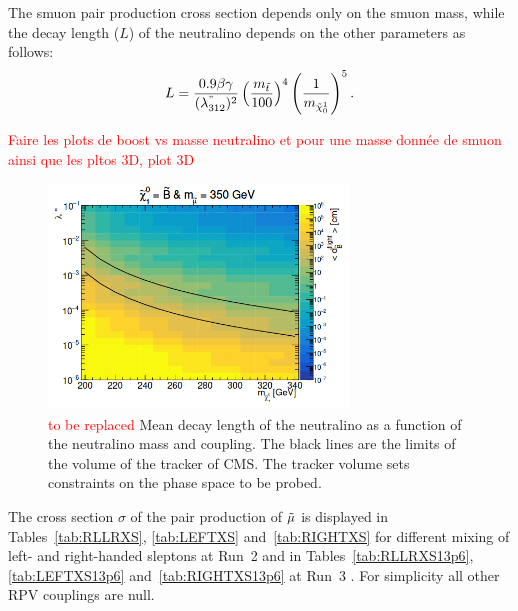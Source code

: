 \documentclass{cernatlasnote}
\begin{document}
\begin{appendices}
The smuon pair production cross section depends only on the smuon mass, while the decay length ($L$) of the neutralino depends on the other parameters as follows:
$$ L = \frac{0.9 \beta\gamma}{(\lambda^{"}_{312})^2} \left(\frac{m_{\Tilde{t}}}{100}\right)^{4} \left(\frac{1}{m_{\Tilde{\chi}_{0}^{1}}}\right)^5. $$

\textcolor{red}{Faire les plots de boost vs masse neutralino et pour une masse donnée de smuon ainsi que les pltos 3D, plot 3D}

\begin{figure}[ht]
\centering
\includegraphics[height=6cm, width=8cm, trim= 0cm 0cm 0cm 0.cm,clip]{images/PhaseSPace/Meandecaylength.png}
\caption{\label{fig:bgctau} \textcolor{red}{to be replaced} Mean decay length of the neutralino as a function of the neutralino mass and coupling. The black lines are the limits of the volume of the tracker of CMS. The tracker volume sets constraints on the phase space to be probed.}
\end{figure}

The cross section $\sigma$ of the pair production of $\Tilde{\mu}$ is displayed in Tables~\ref{tab:RLLRXS}, \ref{tab:LEFTXS} and~\ref{tab:RIGHTXS} for different mixing of left- and right-handed sleptons at Run~2 and in Tables~\ref{tab:RLLRXS13p6}, \ref{tab:LEFTXS13p6} and~\ref{tab:RIGHTXS13p6} at Run~3 . For simplicity all other RPV couplings are null. 


\end{appendices}
\end{document}
